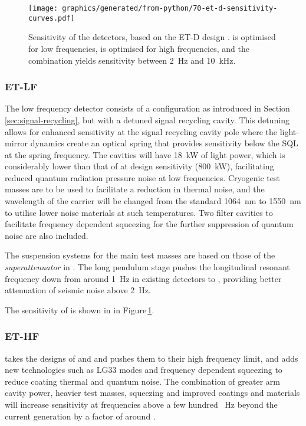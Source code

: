 \begin{figure}
  \centering
  \texttt{[image: graphics/generated/from-python/70-et-d-sensitivity-curves.pdf]}
  \caption[Sensitivity curves for the Einstein Telescope]{\label{fig:et-d-sensitivity}Sensitivity of the \ET{} detectors, based on the ET-D design \cite{Hild2011}. \ETLF{} is optimised for low frequencies, \ETHF{} is optimised for high frequencies, and the combination yields sensitivity between \SI{2}{\hertz} and \SI{10}{\kilo\hertz}.}
\end{figure}

\subsubsection{ET-LF}
The low frequency detector consists of a \DRFPMI{} configuration as introduced in Section\,\ref{sec:signal-recycling}, but with a detuned signal recycling cavity. This detuning allows for enhanced sensitivity at the signal recycling cavity pole where the light-mirror dynamics create an optical spring that provides sensitivity below the \gls{SQL} at the spring frequency. The cavities will have \SI{18}{\kilo\watt} of light power, which is considerably lower than that of \ALIGO{} at design sensitivity (\SI{800}{\kilo\watt}), facilitating reduced quantum radiation pressure noise at low frequencies. Cryogenic test masses are to be used to facilitate a reduction in thermal noise, and the wavelength of the carrier will be changed from the standard \SI{1064}{\nano\meter} to \SI{1550}{\nano\meter} to utilise lower noise materials at such temperatures. Two filter cavities to facilitate frequency dependent squeezing for the further suppression of quantum noise are also included.

The suspension systems for the main test masses are based on those of the \emph{superattenuator} in \VIRGO{} \cite{Acernese2010}. The  long pendulum stage  pushes the longitudinal resonant frequency down from around \SI{1}{\hertz} in existing detectors to , providing better attenuation of seismic noise above \SI{2}{\hertz}.

The sensitivity of \ETLF{} is shown in  in Figure\,\ref{fig:et-d-sensitivity}.

\subsubsection{ET-HF}
\ETHF{} takes the designs of \ALIGO{} and \AVIRGO{} and pushes them to their high frequency limit, and adds new technologies such as LG33 modes \cite{Carbone2013} and frequency dependent squeezing \cite{Kimble2001} to reduce coating thermal and quantum noise. The combination of greater arm cavity power, heavier test masses, squeezing and improved coatings and materials will increase sensitivity at frequencies above a few hundred \SI{}{\hertz} beyond the current generation by a factor of around .

